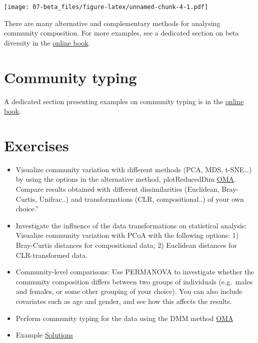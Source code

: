 \documentclass[
  oneside]{book}
\begin{document}
\texttt{[image: 07-beta\_files/figure-latex/unnamed-chunk-4-1.pdf]}

There are many alternative and complementary methods for analysing
community composition. For more examples, see a dedicated section on
beta diversity in the \href{https://microbiome.github.io/OMA/microbiome-diversity.html\#beta-diversity}{online
book}.

\hypertarget{community-typing}{%
\section{Community typing}\label{community-typing}}

A dedicated section presenting examples on community typing is in the
\href{https://microbiome.github.io/OMA/microbiome-community.html\#community-typing}{online book}.

\hypertarget{exercises-1}{%
\section{Exercises}\label{exercises-1}}

\begin{itemize}
\item
  Visualize community variation with different methods (PCA, MDS, t-SNE\ldots) by using the options in the alternative method, plotReducedDim \href{https://microbiome.github.io/OMA/microbiome-diversity.html\#estimating-beta-diversity}{OMA}. Compare results obtained with different dissimilarities (Euclidean, Bray-Curtis, Unifrac..) and transformations (CLR, compositional..) of your own choice.''
\item
  Investigate the influence of the data transformations on
  statistical analysis: Visualize community variation with PCoA with
  the following options: 1) Bray-Curtis distances for compositional
  data; 2) Euclidean distances for CLR-transformed data.
\item
  Community-level comparisons: Use PERMANOVA to investigate whether
  the community composition differs between two groups of individuals
  (e.g.~males and females, or some other grouping of your
  choice). You can also include covariates such as age and gender,
  and see how this affects the results.
\item
  Perform community typing for the data using the DMM method \href{https://microbiome.github.io/OMA/microbiome-community.html\#community-typing}{OMA}
\item
  Example \href{08-5-ex-sol-ADHD.html}{Solutions}
\end{itemize}
\end{document}
